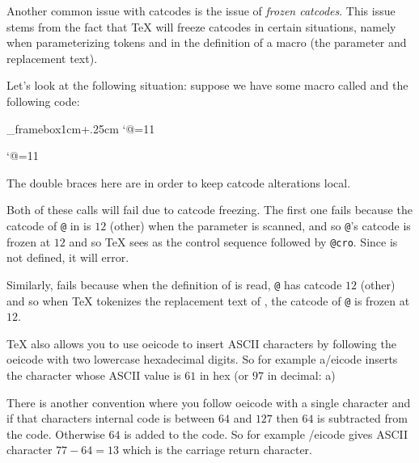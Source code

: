 {{    \endtextbox

\endslide

\beginslide
    \oheadline

    \textbox\empty{1cm}{2cm}{\hsize-2cm}{}
        Another common issue with catcodes is the issue of {\it frozen catcodes}.
        This issue stems from the fact that \TeX{} will freeze catcodes in certain situations, namely when parameterizing tokens and in the definition of a macro (the parameter and replacement text).

        Let's look at the following situation: suppose we have some macro called \macroname\m@cro{} and the following code:
    \endtextbox

    \textbox\_framebox{1cm}{\lastey+.25cm}{\hsize-2cm}{}
\beginhi
\def\identity#1{#1}
\identity{{\catcode`@=11\relax \m@cro}}

\def\macro{{\catcode`@=11\relax \m@cro}}
\macro
\endhi
    \endtextbox

    \textbox\empty{1cm}{\lastey+.25cm}{\hsize-2cm}{}
        The double braces here are in order to keep catcode alterations local.

        Both of these calls will fail due to catcode freezing.
        The first one fails because the catcode of {\tt @} in \macroname\m@cro{} is $12$ (other) when the parameter is scanned, and so {\tt @}'s catcode is frozen at $12$ and so \TeX{} sees
        \macroname\m@cro{} as the control sequence \macroname\m{} followed by {\tt @cro}.
        Since \macroname\m{} is not defined, it will error.

        Similarly, \macroname\macro{} fails because when the definition of \macroname\macro{} is read, {\tt @} has catcode $12$ (other) and so when \TeX{} tokenizes the replacement text of \macroname\macro,
        the catcode of {\tt @} is frozen at $12$.
    \endtextbox

\endslide

\beginslide
    \oheadline

    \textbox\empty{1cm}{2cm}{\hsize-2cm}{}
        \TeX{} also allows you to use \icode ^^/eicode{} to insert ASCII characters by following the \icode ^^/eicode{} with two lowercase hexadecimal digits.
        So for example \icode ^^61/eicode{} inserts the character whose ASCII value is $61$ in hex (or $97$ in decimal: ^^61)

        There is another convention where you follow \icode ^^/eicode{} with a single character and if that characters internal code is between $64$ and $127$ then $64$ is subtracted from the code.
        Otherwise $64$ is added to the code.
        So for example \icode ^^M/eicode{} gives ASCII character $77-64=13$ which is the carriage return character.
    \endtextbox

}}
